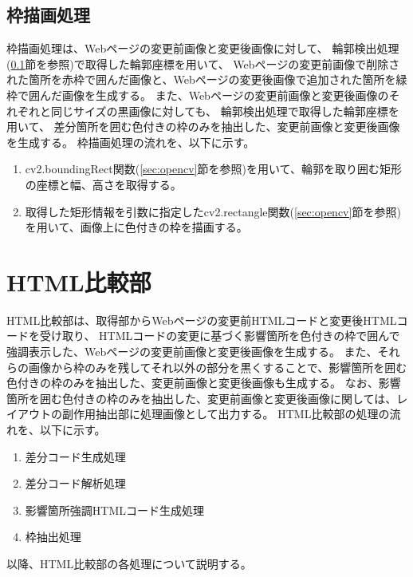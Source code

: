 \subsection{枠描画処理}\label{subsec:Bounding box drawing process}
枠描画処理は、Webページの変更前画像と変更後画像に対して、
輪郭検出処理(\ref{subsec:Bounding box drawing process}節を参照)で取得した輪郭座標を用いて、
Webページの変更前画像で削除された箇所を赤枠で囲んだ画像と、Webページの変更後画像で追加された箇所を緑枠で囲んだ画像を生成する。
また、Webページの変更前画像と変更後画像のそれぞれと同じサイズの黒画像に対しても、
輪郭検出処理で取得した輪郭座標を用いて、
差分箇所を囲む色付きの枠のみを抽出した、変更前画像と変更後画像を生成する。
枠描画処理の流れを、以下に示す。
\begin{enumerate}
    \item cv2.boundingRect関数(\ref{sec:opencv}節を参照)を用いて、輪郭を取り囲む矩形の座標と幅、高さを取得する。
    \item 取得した矩形情報を引数に指定したcv2.rectangle関数(\ref{sec:opencv}節を参照)を用いて、画像上に色付きの枠を描画する。
\end{enumerate}


\section{HTML比較部}\label{sec:Affected_area_extraction}
HTML比較部は、取得部からWebページの変更前HTMLコードと変更後HTMLコードを受け取り、
HTMLコードの変更に基づく影響箇所を色付きの枠で囲んで強調表示した、Webページの変更前画像と変更後画像を生成する。
また、それらの画像から枠のみを残してそれ以外の部分を黒くすることで、影響箇所を囲む色付きの枠のみを抽出した、変更前画像と変更後画像も生成する。
なお、影響箇所を囲む色付きの枠のみを抽出した、変更前画像と変更後画像に関しては、レイアウトの副作用抽出部に処理画像として出力する。
HTML比較部の処理の流れを、以下に示す。
\begin{enumerate}
    \item 差分コード生成処理
    \item 差分コード解析処理
    \item 影響箇所強調HTMLコード生成処理
    \item 枠抽出処理
\end{enumerate}
以降、HTML比較部の各処理について説明する。

